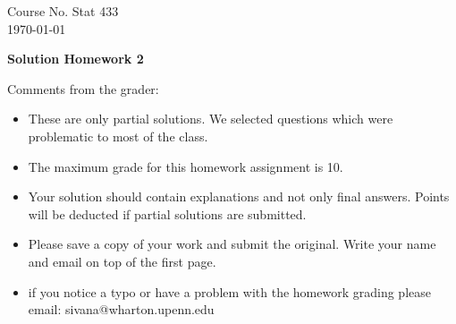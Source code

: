 \documentclass[10pt,a4paper]{article}
\begin{document}
\begin{flushleft}
Course No. Stat 433 \\
\today
\end{flushleft}

\begin{center}
{\Large{\bf Solution Homework 2}}
\end{center}

\textcolor[rgb]{0.98,0.00,0.00}{Comments from the grader:}
\begin{itemize}

    \item \textcolor[rgb]{0.98,0.00,0.00}{These are only partial solutions.  We selected
    questions which were problematic to most of the class.}
    \item \textcolor[rgb]{0.98,0.00,0.00}{The maximum grade for this homework assignment is 10.}
    \item \textcolor[rgb]{0.98,0.00,0.00}{Your solution should contain explanations and not only
    final answers. Points will be deducted if partial solutions
    are submitted.}
    \item \textcolor[rgb]{0.98,0.00,0.00}{Please save a copy of your work and submit the original.
    Write your name and email on top of the first page.}
    \item \textcolor[rgb]{0.98,0.00,0.00}{if you notice a typo or have a problem with the homework
    grading please email: sivana@wharton.upenn.edu
}
\end{itemize}
\end{document}
